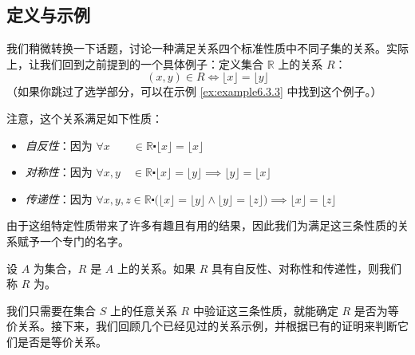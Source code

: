 
\subsection{定义与示例}

我们稍微转换一下话题，讨论一种满足关系四个标准性质中不同子集的关系。实际上，让我们回到之前提到的一个具体例子：定义集合 $\mathbb{R}$ 上的关系 $R$：
\[(x, y) \in R \iff \lfloor x \rfloor = \lfloor y \rfloor\]
（如果你跳过了选学部分，可以在示例 \ref{ex:example6.3.3} 中找到这个例子。）

注意，这个关系满足如下性质：
\begin{itemize}
    \item \emph{自反性}：因为 $\forall x \qquad \in \mathbb{R} \centerdot \lfloor x \rfloor = \lfloor x \rfloor$
    \item \emph{对称性}：因为 $\forall x, y \quad \in \mathbb{R} \centerdot \lfloor x \rfloor = \lfloor y \rfloor \implies \lfloor y \rfloor = \lfloor x \rfloor$
    \item \emph{传递性}：因为 $\forall x, y, z \in \mathbb{R} \centerdot \big(\lfloor x \rfloor = \lfloor y \rfloor \land \lfloor y \rfloor = \lfloor z \rfloor \big) \implies \lfloor x \rfloor = \lfloor z \rfloor$
\end{itemize}
由于这组特定性质带来了许多有趣且有用的结果，因此我们为满足这三条性质的关系赋予一个专门的名字。

\begin{definition}
    设 $A$ 为集合，$R$ 是 $A$ 上的关系。如果 $R$ 具有自反性、对称性和传递性，则我们称 $R$ 为。
\end{definition}

我们只需要在集合 $S$ 上的任意关系 $R$ 中验证这三条性质，就能确定 $R$ 是否为等价关系。接下来，我们回顾几个已经见过的关系示例，并根据已有的证明来判断它们是否是等价关系。\\

